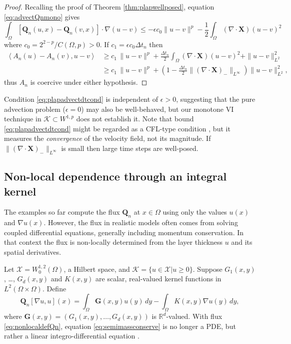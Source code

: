 \documentclass[final,onefignum]{siamart190516}
\newcommand\bG{\mathbf{G}}
\newcommand\bQ{\mathbf{Q}}
\newcommand\bX{\mathbf{X}}
\newcommand{\Div}{\nabla\cdot}
\newcommand\eps{\epsilon}
\newcommand{\grad}{\nabla}
\newcommand{\ip}[2]{\ensuremath{\left<#1,#2\right>}}
\newcommand\RR{\mathbb{R}}
\begin{document}
\begin{proof} Recalling the proof of Theorem \ref{thm:plapwellposed}, equation \eqref{eq:advectQnmono} gives
\begin{equation*}
\int_\Omega \left[\bQ_n(u,x) - \bQ_n(v,x)\right] \cdot \grad (u - v) \le - \eps c_0 \|u-v\|^p - \frac{1}{2} \int_\Omega (\Div\bX) (u-v)^2
\end{equation*}
where $c_0=2^{2-p}/C(\Omega,p)>0$.  If $c_1 = \eps c_0 \Delta t_n$ then
\begin{align*}
\ip{A_n(u) - A_n(v)}{u-v} &\ge c_1\, \|u-v\|^p + \frac{\Delta t_n}{2} \int_\Omega (\Div\bX) (u-v)^2 + \|u-v\|_{L^2}^2 \\
   &\ge c_1\, \|u-v\|^p + \left(1 - \frac{\Delta t_n}{2} \|(\Div \bX)_-\|_{L^\infty}\right) \|u-v\|_{L^2}^2,
\end{align*}
thus $A_n$ is coercive under either hypothesis. \end{proof}

Condition \eqref{eq:plapadvectdtcond} is independent of $\eps>0$, suggesting that the pure advection problem ($\eps = 0$) may also be well-behaved, but our monotone VI technique in $\mathcal{K} \subset W^{1,p}$ does not establish it.  Note that bound \eqref{eq:plapadvectdtcond} might be regarded as a CFL-type condition \cite{LeVeque2002}, but it measures the \emph{convergence} of the velocity field, not its magnitude.  If $\|(\Div \bX)_-\|_{L^\infty}$ is small then large time steps are well-posed.


\subsection{Non-local dependence through an integral kernel} \label{subsec:nonlocal}   The examples so far compute the flux $\bQ_n$ at $x\in\Omega$ using only the values $u(x)$ and $\grad u(x)$.  However, the flux in realistic models often comes from solving coupled differential equations, generally including momentum conservation.  In that context the flux is non-locally determined from the layer thickness $u$ and its spatial derivatives.

Let $\mathcal{X} = W_0^{1,2}(\Omega)$, a Hilbert space, and $\mathcal{K}=\{u\in\mathcal{X}|u\ge 0\}$.  Suppose $G_1(x,y)$, \dots, $G_d(x,y)$ and $K(x,y)$ are scalar, real-valued kernel functions in $L^2(\Omega\times \Omega)$.  Define
\begin{equation}
\bQ_n[\grad u,u](x) = \int_\Omega \bG(x,y) u(y)\,dy - \int_\Omega K(x,y) \grad u(y)\,dy, \label{eq:nonlocaldefQn}
\end{equation}
where $\bG(x,y) = (G_1(x,y), \dots, G_d(x,y))$ is $\RR^d$-valued.  With flux \eqref{eq:nonlocaldefQn}, equation \eqref{eq:semimassconserve} is no longer a PDE, but rather a linear integro-differential equation \cite{PorterStirling1990}.
\end{document}
